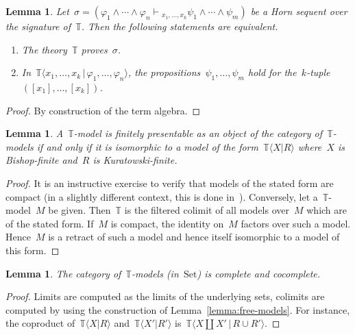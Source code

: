 \documentclass[oneside,reqno]{amsart}
\theoremstyle{definition}
\theoremstyle{plain}
\newtheorem{lemma}[defn]{Lemma}
\theoremstyle{remark}
\newcommand{\TT}{\mathbb{T}}
\newcommand{\Set}{\mathrm{Set}}
\renewcommand{\_}{\mathpunct{.}\,}
\newcommand{\?}{\,{:}\,}
\newcommand{\seq}[1]{\mathrel{\vdash\!\!\!_{#1}}}
\begin{document}
\begin{lemma}Let~$\sigma = (\varphi_1 \wedge \cdots \wedge \varphi_n
\seq{x_1,\ldots,x_k} \psi_1 \wedge \cdots \wedge \psi_m)$ be a Horn sequent
over the signature of~$\TT$. Then the following statements are equivalent.
\begin{enumerate}
\item The theory~$\TT$ proves~$\sigma$. \smallskip
\item In~$\TT\langle x_1,\ldots,x_k \,|\, \varphi_1,\ldots,\varphi_n \rangle$, the
propositions~$\psi_1,\ldots,\psi_m$ hold for
the~$k$-tuple~$([x_1],\ldots,[x_k])$.
\end{enumerate}
\end{lemma}

\begin{proof}By construction of the term algebra.\end{proof}

\begin{lemma}\label{lemma:char-fp-models}
A~$\TT$-model is finitely presentable as an object of the category
of~$\TT$-models if and only if it is isomorphic to a model of the
form~$\TT\langle X | R \rangle$ where~$X$ is Bishop-finite and~$R$ is
Kuratowski-finite.
\end{lemma}

\begin{proof}It is an instructive exercise to verify that models of the stated
form are compact (in a slightly different context, this is done
in~\cite[Theorem~3.12]{adamek-rosicky:presentable}). Conversely, let
a~$\TT$-model~$M$ be given. Then~$\TT$ is the
filtered colimit of all models over~$M$ which are of the stated form. If~$M$ is
compact, the identity on~$M$ factors over such a model. Hence~$M$ is a
retract of such a model and hence itself isomorphic to a model of this form.
\end{proof}

\begin{lemma}The category of~$\TT$-models (in~$\Set$) is complete and
cocomplete.\end{lemma}

\begin{proof}Limits are computed as the limits of the underlying sets, colimits
are computed by using the construction of Lemma~\ref{lemma:free-models}. For
instance, the coproduct of~$\TT\langle X | R \rangle$ and~$\TT\langle X' | R'
\rangle$ is~$\TT\langle X \amalg X' \,|\, R \cup R' \rangle$.\end{proof}
\end{document}
